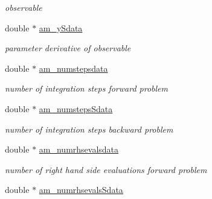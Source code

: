 \begin{DoxyCompactItemize}
\begin{DoxyCompactList}\small\item\em observable \end{DoxyCompactList}\item 
\hypertarget{struct_return_data_aa2089cdd16d3cb3c9b85f99f570197d1}{}double $\ast$ \hyperlink{struct_return_data_aa2089cdd16d3cb3c9b85f99f570197d1}{am\+\_\+y\+Sdata}\label{struct_return_data_aa2089cdd16d3cb3c9b85f99f570197d1}

\begin{DoxyCompactList}\small\item\em parameter derivative of observable \end{DoxyCompactList}\item 
\hypertarget{struct_return_data_a2ebada170b4bc6a2337794e4ec08d77c}{}double $\ast$ \hyperlink{struct_return_data_a2ebada170b4bc6a2337794e4ec08d77c}{am\+\_\+numstepsdata}\label{struct_return_data_a2ebada170b4bc6a2337794e4ec08d77c}

\begin{DoxyCompactList}\small\item\em number of integration steps forward problem \end{DoxyCompactList}\item 
\hypertarget{struct_return_data_a6852d3762d59842903ef737ed511dc43}{}double $\ast$ \hyperlink{struct_return_data_a6852d3762d59842903ef737ed511dc43}{am\+\_\+numsteps\+Sdata}\label{struct_return_data_a6852d3762d59842903ef737ed511dc43}

\begin{DoxyCompactList}\small\item\em number of integration steps backward problem \end{DoxyCompactList}\item 
\hypertarget{struct_return_data_a480d4eb0a1a568f64b8e939105a0b627}{}double $\ast$ \hyperlink{struct_return_data_a480d4eb0a1a568f64b8e939105a0b627}{am\+\_\+numrhsevalsdata}\label{struct_return_data_a480d4eb0a1a568f64b8e939105a0b627}

\begin{DoxyCompactList}\small\item\em number of right hand side evaluations forward problem \end{DoxyCompactList}\item 
\hypertarget{struct_return_data_a77e958126968de6f5ee3bd1d22129641}{}double $\ast$ \hyperlink{struct_return_data_a77e958126968de6f5ee3bd1d22129641}{am\+\_\+numrhsevals\+Sdata}\label{struct_return_data_a77e958126968de6f5ee3bd1d22129641}


\end{DoxyCompactItemize}
